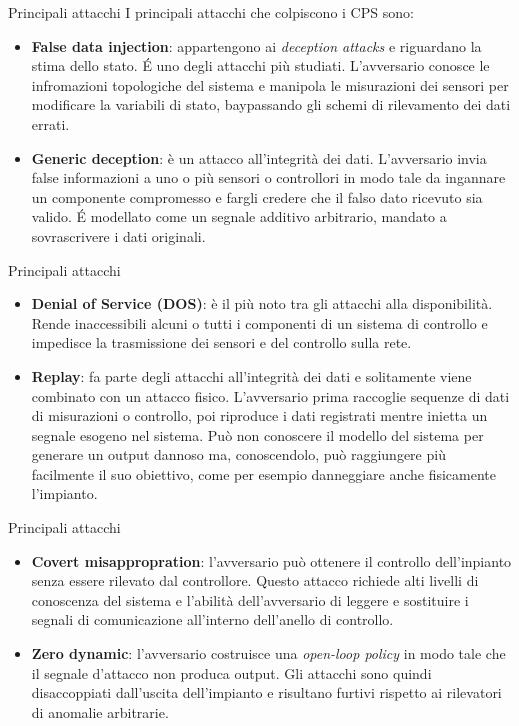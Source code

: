 \documentclass{beamer}
\begin{document}
\begin{frame}{Principali attacchi}
I principali attacchi che colpiscono i CPS sono:
\begin{itemize}
    \item \textbf{False data injection}: appartengono ai \textit{deception attacks} e riguardano la stima dello stato. \'E uno degli attacchi più studiati. 
    L'avversario conosce le infromazioni topologiche del sistema e manipola le misurazioni dei sensori per modificare la variabili di stato, baypassando gli schemi di rilevamento dei dati errati.
    \item \textbf{Generic deception}: è un attacco all'integrità dei dati. L'avversario invia false informazioni a uno o più sensori o controllori in modo tale da ingannare un componente compromesso e fargli credere che il falso dato ricevuto sia valido.
    \'E modellato come un segnale additivo arbitrario, mandato a sovrascrivere i dati originali.
\end{itemize}
\end{frame}

\begin{frame}{Principali attacchi}
\begin{itemize}
    \item \textbf{Denial of Service (DOS)}: è il più noto tra gli attacchi alla disponibilità. Rende inaccessibili alcuni o tutti i componenti di un sistema di controllo e impedisce la trasmissione dei sensori e del controllo sulla rete.
    \item \textbf{Replay}: fa parte degli attacchi all'integrità dei dati e solitamente viene combinato con un attacco fisico. L'avversario prima raccoglie sequenze di dati di misurazioni o controllo, poi riproduce i dati registrati mentre inietta un segnale esogeno nel sistema. Può non conoscere il modello del sistema per generare un output dannoso ma, conoscendolo, può raggiungere più facilmente il suo obiettivo, come per esempio danneggiare anche fisicamente l'impianto.
\end{itemize}
\end{frame}

\begin{frame}{Principali attacchi}
\begin{itemize}
    \item \textbf{Covert misappropration}: l'avversario può ottenere il controllo dell'inpianto senza essere rilevato dal controllore. Questo attacco richiede alti livelli di conoscenza del sistema e l'abilità dell'avversario di leggere e sostituire i segnali di comunicazione  all'interno dell'anello di controllo.
    \item \textbf{Zero dynamic}: l'avversario costruisce una \textit{open-loop policy} in modo tale che il segnale d'attacco non produca output. Gli attacchi sono quindi disaccoppiati dall'uscita dell'impianto e risultano furtivi rispetto ai rilevatori di anomalie arbitrarie. 
\end{itemize}
\end{frame}
\end{document}
